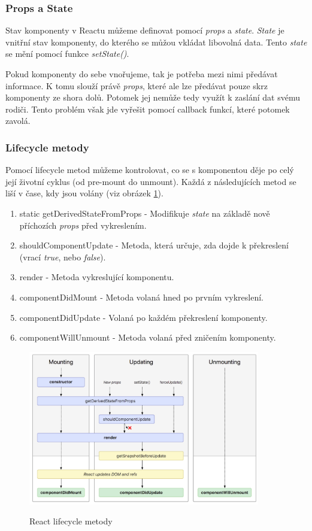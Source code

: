 \documentclass[thesis=M,czech]{FITthesis}[2018/10/20]
\begin{document}
	\subsubsection{Props a State}
	 Stav komponenty v Reactu můžeme definovat pomocí \textit{props} a \textit{state}. \textit{State} je vnitřní stav komponenty, do kterého se můžou vkládat libovolná data. Tento \textit{state} se mění pomocí funkce \textit{setState()}. 
	 
	 Pokud komponenty do sebe vnořujeme, tak je potřeba mezi nimi předávat informace. K tomu slouží právě \textit{props}, které ale lze předávat pouze skrz komponenty ze shora dolů. Potomek jej nemůže tedy využít k zaslání dat svému rodiči. Tento problém však jde vyřešit pomocí callback funkcí, které potomek zavolá.
\subsubsection{Lifecycle metody}
Pomocí lifecycle metod můžeme kontrolovat, co se s komponentou děje po celý její životní cyklus (od pre-mount do unmount). Každá z následujících metod se liší v čase, kdy jsou volány (viz obrázek \ref{fig:react-lifecycle}).
\begin{enumerate}
\item static getDerivedStateFromProps - Modifikuje \textit{state} na základě nově příchozích \textit{props} před vykreslením.
\item shouldComponentUpdate -  Metoda, která určuje, zda dojde k překreslení (vrací \textit{true}, nebo \textit{false}).
\item render - Metoda vykreslující komponentu.
\item componentDidMount - Metoda volaná hned po prvním vykreslení.
\item componentDidUpdate - Volaná po každém překreslení komponenty.
\item componentWillUnmount - Metoda volaná před zničením komponenty.
\end{enumerate}
\begin{figure}[h]
\caption{React lifecycle metody \cite{react-lifecycle-img}}
\centering
\includegraphics[width=0.9\textwidth]{react-lifecycle}
\label{fig:react-lifecycle}
\end{figure}
\end{document}
